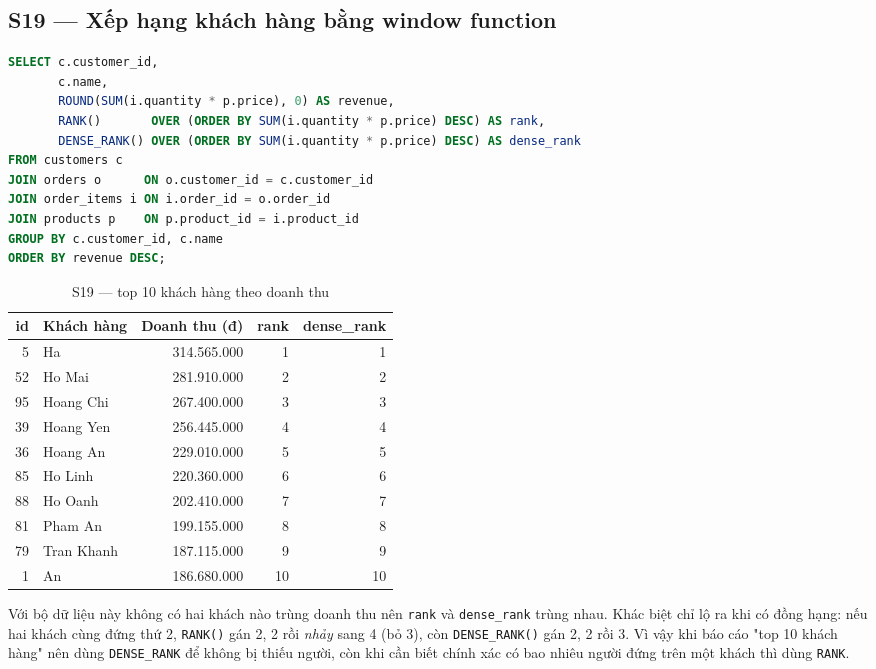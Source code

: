 \documentclass[12pt,a4paper]{article}
\newcommand{\code}[1]{\texttt{\small #1}}
\begin{document}
\subsection{S19 --- Xếp hạng khách hàng bằng window function}

\begin{lstlisting}[language=SQL,caption={S19 --- RANK và DENSE\_RANK}]
SELECT c.customer_id,
       c.name,
       ROUND(SUM(i.quantity * p.price), 0) AS revenue,
       RANK()       OVER (ORDER BY SUM(i.quantity * p.price) DESC) AS rank,
       DENSE_RANK() OVER (ORDER BY SUM(i.quantity * p.price) DESC) AS dense_rank
FROM customers c
JOIN orders o      ON o.customer_id = c.customer_id
JOIN order_items i ON i.order_id = o.order_id
JOIN products p    ON p.product_id = i.product_id
GROUP BY c.customer_id, c.name
ORDER BY revenue DESC;
\end{lstlisting}

\begin{table}[H]
\centering
\caption{S19 --- top 10 khách hàng theo doanh thu}
\label{tab:s19}
\small
\begin{tabular}{@{}r l r r r@{}}
\toprule
\textbf{id} & \textbf{Khách hàng} & \textbf{Doanh thu (đ)} & \textbf{rank} & \textbf{dense\_rank} \\
\midrule
 5 & Ha            & 314.565.000 &  1 &  1 \\
52 & Ho Mai        & 281.910.000 &  2 &  2 \\
95 & Hoang Chi     & 267.400.000 &  3 &  3 \\
39 & Hoang Yen     & 256.445.000 &  4 &  4 \\
36 & Hoang An      & 229.010.000 &  5 &  5 \\
85 & Ho Linh       & 220.360.000 &  6 &  6 \\
88 & Ho Oanh       & 202.410.000 &  7 &  7 \\
81 & Pham An       & 199.155.000 &  8 &  8 \\
79 & Tran Khanh    & 187.115.000 &  9 &  9 \\
 1 & An            & 186.680.000 & 10 & 10 \\
\bottomrule
\end{tabular}
\end{table}

Với bộ dữ liệu này không có hai khách nào trùng doanh thu nên \code{rank} và \code{dense\_rank}
trùng nhau. Khác biệt chỉ lộ ra khi có đồng hạng: nếu hai khách cùng đứng thứ 2, \code{RANK()}
gán 2, 2 rồi \emph{nhảy} sang 4 (bỏ 3), còn \code{DENSE\_RANK()} gán 2, 2 rồi 3. Vì vậy khi báo
cáo "top 10 khách hàng" nên dùng \code{DENSE\_RANK} để không bị thiếu người, còn khi cần biết
chính xác có bao nhiêu người đứng trên một khách thì dùng \code{RANK}.
\end{document}

